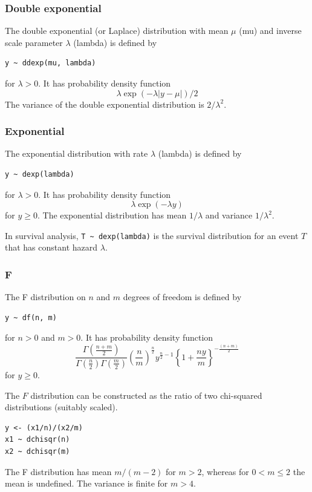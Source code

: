 \documentclass[11pt, a4paper, titlepage]{report}
\begin{document}
{\subsubsection{Double exponential}
\label{bugs:ddexp}

The double exponential (or Laplace) distribution with mean $\mu$ (mu) and
inverse scale parameter $\lambda$ (lambda) is defined by
\begin{verbatim}
y ~ ddexp(mu, lambda)
\end{verbatim}
for $\lambda > 0$. It has probability density function
\[
\lambda \exp(-\lambda | y - \mu |)/2
\]
The variance of the double exponential distribution is $2/\lambda^2$.

\subsubsection{Exponential}
\label{bugs:dexp}

The exponential distribution with rate $\lambda$ (lambda) is defined by
\begin{verbatim}
y ~ dexp(lambda)
\end{verbatim}
for $\lambda > 0$. It has probability density function
\[
\lambda \exp(-\lambda y)
\]
for $y \geq 0$. The exponential distribution has mean $1/\lambda$ and
variance $1/\lambda^2$.

In survival analysis, \verb+T ~ dexp(lambda)+ is the survival distribution
for an event $T$ that has constant hazard $\lambda$.

\subsubsection{F}
\label{bugs:df}

The F distribution on $n$ and $m$ degrees of freedom is defined by
\begin{verbatim}
y ~ df(n, m)
\end{verbatim}
for $n > 0$ and $m > 0$. It has probability density function
\[
\frac{\Gamma(\frac{n + m}{2})}
     {\Gamma(\frac{n}{2}) \Gamma(\frac{m}{2})}
     \left(\frac{n}{m} \right)^{\frac{n}{2}} y^{\frac{n}{2} - 1} 
     \left\{1 + \frac{ny}{m} \right\}^{-\frac{(n + m)}{2}}
\]
for $y \geq 0$.       

The $F$ distribution can be constructed as the ratio of two chi-squared
distributions (suitably scaled).
\begin{verbatim}
y <- (x1/n)/(x2/m)
x1 ~ dchisqr(n)
x2 ~ dchisqr(m)
\end{verbatim}
The F distribution has mean $m/(m-2)$ for $m > 2$, whereas for $0 < m \leq 2$
the mean is undefined. The variance is finite for $m > 4$.

}
\end{document}

